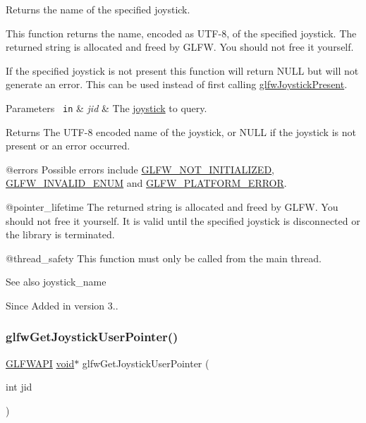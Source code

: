 Returns the name of the specified joystick. 

This function returns the name, encoded as U\+T\+F-\/8, of the specified joystick. The returned string is allocated and freed by G\+L\+FW. You should not free it yourself.

If the specified joystick is not present this function will return {\ttfamily N\+U\+LL} but will not generate an error. This can be used instead of first calling \mbox{\hyperlink{group__input_gacb1b7dfd79df673d48814c06fc436eff}{glfw\+Joystick\+Present}}.


\begin{DoxyParams}[1]{Parameters}
\mbox{\texttt{ in}}  & {\em jid} & The \mbox{\hyperlink{group__joysticks}{joystick}} to query. \\
\hline
\end{DoxyParams}
\begin{DoxyReturn}{Returns}
The U\+T\+F-\/8 encoded name of the joystick, or {\ttfamily N\+U\+LL} if the joystick is not present or an error occurred.
\end{DoxyReturn}
@errors Possible errors include \mbox{\hyperlink{group__errors_ga2374ee02c177f12e1fa76ff3ed15e14a}{G\+L\+F\+W\+\_\+\+N\+O\+T\+\_\+\+I\+N\+I\+T\+I\+A\+L\+I\+Z\+ED}}, \mbox{\hyperlink{group__errors_ga76f6bb9c4eea73db675f096b404593ce}{G\+L\+F\+W\+\_\+\+I\+N\+V\+A\+L\+I\+D\+\_\+\+E\+N\+UM}} and \mbox{\hyperlink{group__errors_gad44162d78100ea5e87cdd38426b8c7a1}{G\+L\+F\+W\+\_\+\+P\+L\+A\+T\+F\+O\+R\+M\+\_\+\+E\+R\+R\+OR}}.

@pointer\+\_\+lifetime The returned string is allocated and freed by G\+L\+FW. You should not free it yourself. It is valid until the specified joystick is disconnected or the library is terminated.

@thread\+\_\+safety This function must only be called from the main thread.

\begin{DoxySeeAlso}{See also}
joystick\+\_\+name
\end{DoxySeeAlso}
\begin{DoxySince}{Since}
Added in version 3.. 
\end{DoxySince}
\mbox{\label{group__input_gaf4317a5b0a7849f9b2b7b2b69366a72b}} 
\subsubsection{\texorpdfstring{glfwGetJoystickUserPointer()}{glfwGetJoystickUserPointer()}}
{\footnotesize\ttfamily \mbox{\hyperlink{glfw3_8h_a56da5036b2cc259351ae22fd6439bb47}{G\+L\+F\+W\+A\+PI}} \mbox{\hyperlink{glad_8h_a950fc91edb4504f62f1c577bf4727c29}{void}}$\ast$ glfw\+Get\+Joystick\+User\+Pointer (\begin{DoxyParamCaption}\item[{int}]{jid }\end{DoxyParamCaption})}



